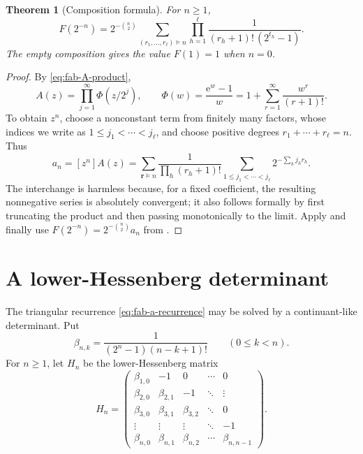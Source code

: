 \documentclass[11pt,oneside,openany]{book}
\newtheorem{theorem}{Theorem}[chapter]
\theoremstyle{definition}
\theoremstyle{remark}
\newcommand{\e}{\mathrm e}
\begin{document}
\begin{theorem}[Composition formula]
\label{thm:fab-composition-formula}
For $n\ge1$,
\begin{equation}
 \boxed{
 F(2^{-n})=
 2^{-\binom n2}
 \sum_{(r_1,\ldots,r_\ell)\vDash n}
 \prod_{h=1}^{\ell}
 \frac1{(r_h+1)!\,(2^{t_h}-1)}.}
 \label{eq:fab-composition-formula}
\end{equation}
The empty composition gives the value $F(1)=1$ when $n=0$.
\end{theorem}

\begin{proof}
By \eqref{eq:fab-A-product},
\[
 A(z)=\prod_{j=1}^{\infty}\Phi(z/2^j),
 \qquad
 \Phi(w)=\frac{\e^w-1}{w}
        =1+\sum_{r=1}^{\infty}\frac{w^r}{(r+1)!}.
\]
To obtain $z^n$, choose a nonconstant term from finitely many factors,
whose indices we write as $1\le j_1<\cdots<j_\ell$, and choose positive
degrees $r_1+\cdots+r_\ell=n$.  Thus
\[
 a_n=[z^n]A(z)
 =\sum_{\boldsymbol r\vDash n}
  \frac1{\prod_h(r_h+1)!}
  \sum_{1\le j_1<\cdots<j_\ell}
  2^{-\sum_hj_hr_h}.
\]
The interchange is harmless because, for a fixed coefficient, the resulting
nonnegative series is absolutely convergent; it also follows formally by
first truncating the product and then passing monotonically to the limit.
Apply  and finally use
$F(2^{-n})=2^{-\binom n2}a_n$ from
.
\end{proof}

\section{A lower-Hessenberg determinant}

The triangular recurrence \eqref{eq:fab-a-recurrence} may be solved by a
continuant-like determinant.  Put
\begin{equation}
 \beta_{n,k}=\frac1{(2^n-1)(n-k+1)!}
 \qquad(0\le k<n).
 \label{eq:fab-beta}
\end{equation}
For $n\ge1$, let $H_n$ be the lower-Hessenberg matrix
\begin{equation}
 H_n=\begin{pmatrix}
 \beta_{1,0}&-1&0&\cdots&0\\
 \beta_{2,0}&\beta_{2,1}&-1&\ddots&\vdots\\
 \beta_{3,0}&\beta_{3,1}&\beta_{3,2}&\ddots&0\\
 \vdots&\vdots&\vdots&\ddots&-1\\
 \beta_{n,0}&\beta_{n,1}&\beta_{n,2}&\cdots&\beta_{n,n-1}
 \end{pmatrix}.
 \label{eq:fab-Hessenberg-matrix}
\end{equation}
\end{document}
